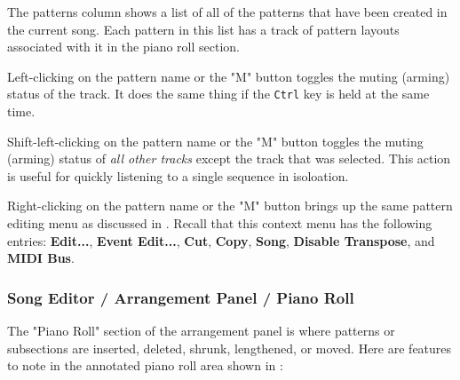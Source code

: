    The patterns column shows a list of all of the patterns that have been
   created in the current song.  Each pattern in this list has a track of
   pattern layouts associated with it in the piano roll section.

   Left-clicking on the pattern name or the "M" button toggles the muting
   (arming) status of the track.
   It does the same thing if the \texttt{Ctrl} key is held at the same time.

   Shift-left-clicking on the pattern name or the "M" button toggles the muting
   (arming) status of \textsl{all other tracks} except the track that was
   selected.  This action is useful for quickly listening to a single sequence
   in isoloation.

   Right-clicking on the pattern name or the "M" button brings up the same
   pattern editing menu as discussed in
   .
   Recall that this context menu has the following entries:
   \textbf{Edit...}, \textbf{Event Edit...}, \textbf{Cut}, \textbf{Copy},
   \textbf{Song}, \textbf{Disable Transpose}, and \textbf{MIDI Bus}.

\subsubsection{Song Editor / Arrangement Panel / Piano Roll}
\label{subsubsec:seq66_song_editor_arrangement_panel_roll}

   The "Piano Roll" section of the arrangement panel is where patterns or
   subsections are inserted, deleted, shrunk, lengthened, or moved.
   Here are features to note in the annotated piano roll area
   shown in :


